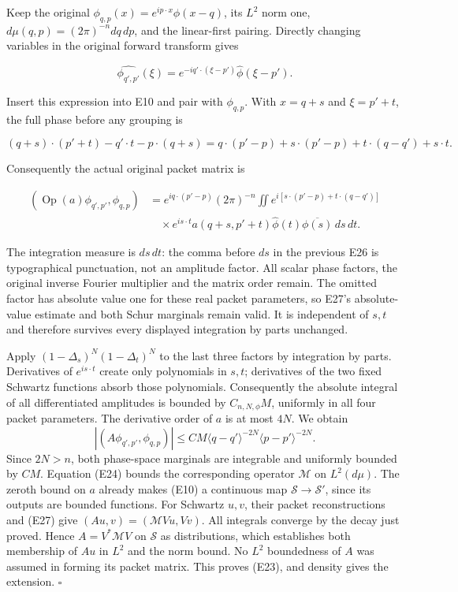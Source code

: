 \documentclass[
  11pt,
]{article}
\begin{document}
Keep the original \(\phi_{q,p}(x)=e^{ip\cdot x}\phi(x-q)\), its \(L^2\)
norm one, \(d\mu(q,p)=(2\pi)^{-n}dq\,dp\), and the linear-first pairing.
Directly changing variables in the original forward transform gives

\[
 \widehat{\phi_{q',p'}}(\xi)
 =e^{-iq'\cdot(\xi-p')}\widehat\phi(\xi-p').
 \tag{EC12}
\]

Insert this expression into E10 and pair with \(\phi_{q,p}\). With
\(x=q+s\) and \(\xi=p'+t\), the full phase before any grouping is

\[
 (q+s)\cdot(p'+t)-q'\cdot t-p\cdot(q+s)
 =q\cdot(p'-p)+s\cdot(p'-p)
  +t\cdot(q-q')+s\cdot t.
 \tag{EC13}
\]

Consequently the actual original packet matrix is

\[
 \begin{split}
 (\operatorname{Op}(a)\phi_{q',p'},\phi_{q,p})
 &=e^{iq\cdot(p'-p)}(2\pi)^{-n}
   \iint e^{i[s\cdot(p'-p)+t\cdot(q-q')]}\\
 &\quad{}\times e^{is\cdot t}
       a(q+s,p'+t)\widehat\phi(t)\overline{\phi(s)}\,ds\,dt .
 \end{split}
 \tag{EC14}
\]

The integration measure is \(ds\,dt\): the comma before \(ds\) in the
previous E26 is typographical punctuation, not an amplitude factor. All
scalar phase factors, the original inverse Fourier multiplier and the
matrix order remain. The omitted factor has absolute value one for these
real packet parameters, so E27's absolute-value estimate and both Schur
marginals remain valid. It is independent of \(s,t\) and therefore
survives every displayed integration by parts unchanged.

Apply \((1-\Delta_s)^N(1-\Delta_t)^N\) to the last three factors by
integration by parts. Derivatives of \(e^{is\cdot t}\) create only
polynomials in \(s,t\); derivatives of the two fixed Schwartz functions
absorb those polynomials. Consequently the absolute integral of all
differentiated amplitudes is bounded by \(C_{n,N,\phi}M\), uniformly in
all four packet parameters. The derivative order of \(a\) is at most
\(4N\). We obtain \[
|(A\phi_{q',p'},\phi_{q,p})|
\leq CM\langle q-q'\rangle^{-2N}
\langle p-p'\rangle^{-2N}.
\tag{E27}
\] Since \(2N>n\), both phase-space marginals are integrable and
uniformly bounded by \(CM\). Equation (E24) bounds the corresponding
operator \(\mathcal M\) on \(L^2(d\mu)\). The zeroth bound on \(a\)
already makes (E10) a continuous map \(\mathcal S\to\mathcal S'\), since
its outputs are bounded functions. For Schwartz \(u,v\), their packet
reconstructions and (E27) give \((Au,v)=(\mathcal M Vu,Vv)\). All
integrals converge by the decay just proved. Hence \(A=V^*\mathcal M V\)
on \(\mathcal S\) as distributions, which establishes both membership of
\(Au\) in \(L^2\) and the norm bound. No \(L^2\) boundedness of \(A\)
was assumed in forming its packet matrix. This proves (E23), and density
gives the extension. \(\square\)
\end{document}
